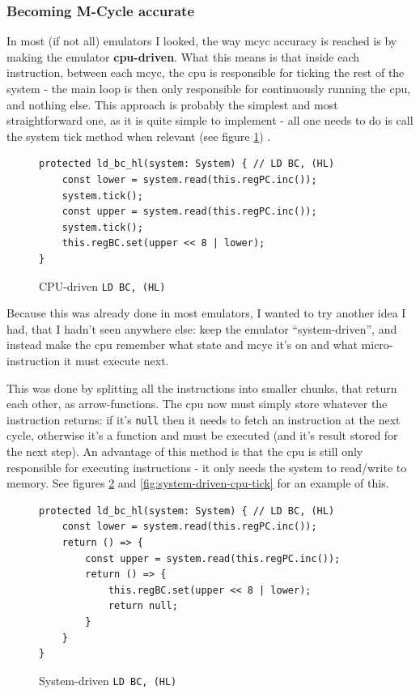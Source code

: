 \documentclass[11pt]{report}
\begin{document}
\subsubsection{Becoming M-Cycle accurate}

In most (if not all) emulators I looked, the way \gls{mcyc} accuracy is reached is by making the emulator \textbf{\gls{cpu}-driven}. What this means is that inside each instruction, between each \gls{mcyc}, the \gls{cpu} is responsible for ticking the rest of the system - the main loop is then only responsible for continuously running the \gls{cpu}, and nothing else. This approach is probably the simplest and most straightforward one, as it is quite simple to implement - all one needs to do is call the system tick method when relevant (see figure \ref{fig:cpu-driven-ld}) .

\begin{figure}[h]
    \begin{verbatim}
protected ld_bc_hl(system: System) { // LD BC, (HL)
    const lower = system.read(this.regPC.inc());
    system.tick();
    const upper = system.read(this.regPC.inc());
    system.tick();
    this.regBC.set(upper << 8 | lower);
}
    \end{verbatim}
    \caption{CPU-driven \texttt{LD BC, (HL)}}
    \label{fig:cpu-driven-ld}
\end{figure}

Because this was already done in most emulators, I wanted to try another idea I had, that I hadn't seen anywhere else: keep the emulator ``system-driven'', and instead make the \gls{cpu} remember what state and \gls{mcyc} it's on and what micro-instruction it must execute next.

This was done by splitting all the instructions into smaller chunks, that return each other, as arrow-functions. The \gls{cpu} now must simply store whatever the instruction returns: if it's \texttt{null} then it needs to fetch an instruction at the next cycle, otherwise it's a function and must be executed (and it's result stored for the next step). An advantage of this method is that the \gls{cpu} is still only responsible for executing instructions - it only needs the system to read/write to memory. See figures \ref{fig:system-driven-ld} and \ref{fig:system-driven-cpu-tick} for an example of this.

\begin{figure}[h]
    \begin{verbatim}
protected ld_bc_hl(system: System) { // LD BC, (HL)
    const lower = system.read(this.regPC.inc());
    return () => {
        const upper = system.read(this.regPC.inc());
        return () => {
            this.regBC.set(upper << 8 | lower);
            return null;
        }
    }
}
    \end{verbatim}
    \caption{System-driven \texttt{LD BC, (HL)}}
    \label{fig:system-driven-ld}
\end{figure}
\end{document}
